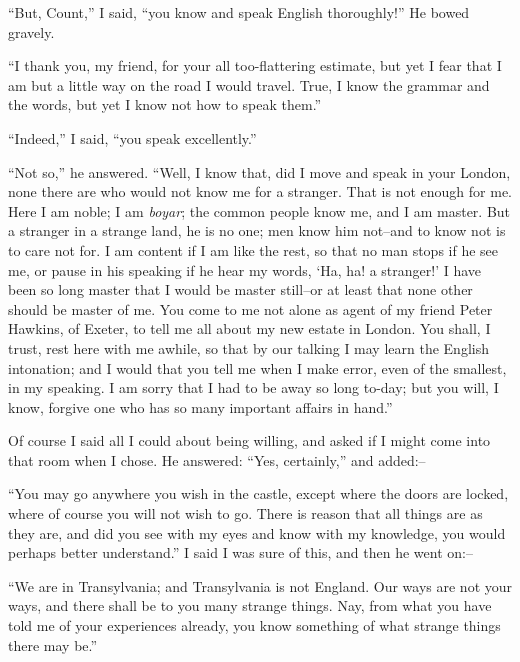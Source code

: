 \documentclass[12pt,openright]{book}
\begin{document}
“But, Count,” I said, “you know and speak English thoroughly!” He bowed gravely.

“I thank you, my friend, for your all too-flattering estimate, but yet I fear that I am but a little way on the road I would travel. True, I know the grammar and the words, but yet I know not how to speak them.”

“Indeed,” I said, “you speak excellently.”

“Not so,” he answered. “Well, I know that, did I move and speak in your London, none there are who would not know me for a stranger. That is not enough for me. Here I am noble; I am \textit{boyar}; the common people know me, and I am master. But a stranger in a strange land, he is no one; men know him not–and to know not is to care not for. I am content if I am like the rest, so that no man stops if he see me, or pause in his speaking if he hear my words, ‘Ha, ha! a stranger!’ I have been so long master that I would be master still–or at least that none other should be master of me. You come to me not alone as agent of my friend Peter Hawkins, of Exeter, to tell me all about my new estate in London. You shall, I trust, rest here with me awhile, so that by our talking I may learn the English intonation; and I would that you tell me when I make error, even of the smallest, in my speaking. I am sorry that I had to be away so long to-day; but you will, I know, forgive one who has so many important affairs in hand.”

Of course I said all I could about being willing, and asked if I might come into that room when I chose. He answered: “Yes, certainly,” and added:–

“You may go anywhere you wish in the castle, except where the doors are locked, where of course you will not wish to go. There is reason that all things are as they are, and did you see with my eyes and know with my knowledge, you would perhaps better understand.” I said I was sure of this, and then he went on:–

“We are in Transylvania; and Transylvania is not England. Our ways are not your ways, and there shall be to you many strange things. Nay, from what you have told me of your experiences already, you know something of what strange things there may be.”
\end{document}
